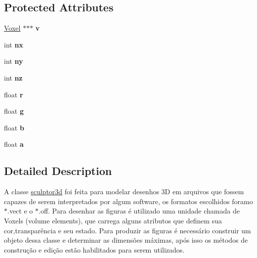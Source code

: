 \subsection*{Protected Attributes}
\begin{DoxyCompactItemize}
\item 
\mbox{\label{classsculptor3d_aa203c37fa6a40ce6a96b818b999291f0}} 
\mbox{\hyperlink{struct_voxel}{Voxel}} $\ast$$\ast$$\ast$ {\bfseries v}
\item 
\mbox{\label{classsculptor3d_ae609eab63f0f21d15e2713928001212c}} 
int {\bfseries nx}
\item 
\mbox{\label{classsculptor3d_a270d21a9e67e1bf6cc7103c9c6356c0f}} 
int {\bfseries ny}
\item 
\mbox{\label{classsculptor3d_a64f2963f1cb9e3a2ce0cce2c085ca7a2}} 
int {\bfseries nz}
\item 
\mbox{\label{classsculptor3d_ac9efb16a4567c5823eb5d0e1bc44c103}} 
float {\bfseries r}
\item 
\mbox{\label{classsculptor3d_ad7e2e9e417b52b665de53ec8dbcc8388}} 
float {\bfseries g}
\item 
\mbox{\label{classsculptor3d_a183f4013dfd30806b881363dc6bef47e}} 
float {\bfseries b}
\item 
\mbox{\label{classsculptor3d_a899685e3854e58c2eb44b8a4b7f78455}} 
float {\bfseries a}
\end{DoxyCompactItemize}


\subsection{Detailed Description}
A classe \mbox{\hyperlink{classsculptor3d}{sculptor3d}} foi feita para modelar desenhos 3D em arquivos que fossem capazes de serem interpretados por algum software, os formatos escolhidos foramo $\ast$.vect e o $\ast$.off. Para desenhar as figuras é utilizado uma unidade chamada de Voxels (volume elements), que carrega alguns atributos que definem sua cor,transparência e seu estado. Para produzir as figuras é necessário construir um objeto dessa classe e determinar as dimensões máximas, após isso os métodos de construção e edição estão habilitados para serem utilizados. 

